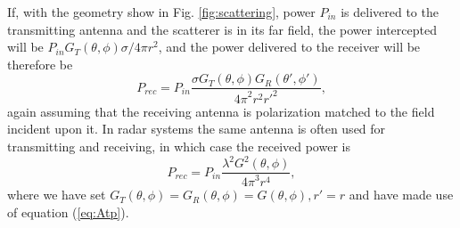 If, with the geometry show in Fig. \ref{fig:scattering}, power $P_{in}$ is delivered to the transmitting antenna and the scatterer is in its far field, the power intercepted will be $P_{in}G_T(\theta,\phi)\sigma/4\pi r^2$, and the power delivered to the receiver will be therefore be
\begin{equation}
P_{rec}=P_{in}\dfrac{\sigma G_T(\theta,\phi)G_R(\theta',\phi')}{{4\pi}^2r^2{r'}^2},
\end{equation}
again assuming that the receiving antenna is polarization matched to the field incident upon it. In radar systems the same antenna is often used for transmitting and receiving, in which case the received power is
\begin{equation}
P_{rec}=P_{in}\dfrac{\lambda^2G^2(\theta,\phi)}{{4\pi}^3r^4},
\end{equation}
where we have set $G_T(\theta,\phi)=G_R(\theta,\phi)=G(\theta,\phi), r'=r$ and have made use of equation (\ref{eq:Atp}).